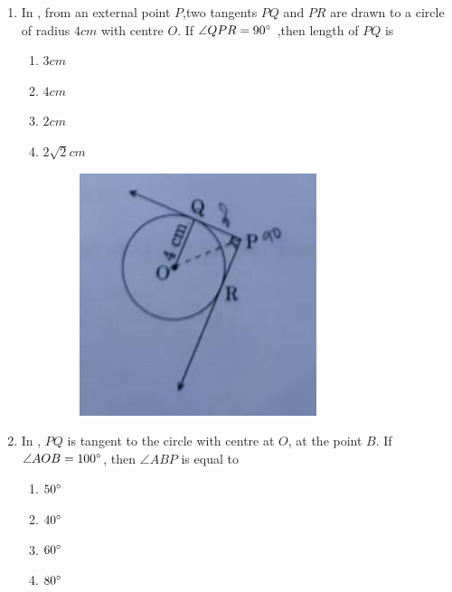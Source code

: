 \begin{enumerate}
\item In , from an external point $P$,two tangents $PQ$ and $PR$ are drawn to a circle of radius $4cm$ with centre $O$. If $\angle QPR=90\degree$ ,then length of $PQ$ is 
\begin{enumerate}[label=(\Alph*)]
\item $3cm$
\item $4cm$
\item $2cm$
\item $2\sqrt{2}cm$
\begin{figure}[H]
\centering
\includegraphics[width=\columnwidth]{figs/circ.jpg}
\caption{}
\label{fig:circ.jpg}
\end{figure}
\end{enumerate}
\item In , $PQ$ is tangent to the circle with centre at $O$, at the point $B$. If $\angle AOB=100\degree$, then $\angle ABP$ is equal to
\begin{enumerate}[label=(\Alph*)]
\item $50\degree$
\item $40\degree$
\item $60\degree$
\item $80\degree$
\begin{figure}[H]

\end{figure}
\end{enumerate}
\end{enumerate}
